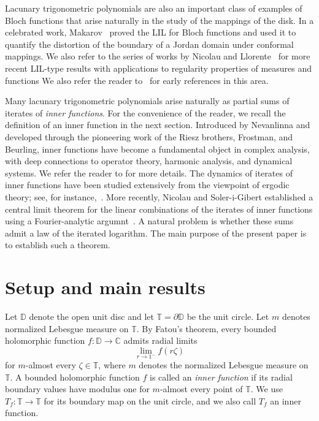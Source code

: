 \documentclass[12pt, reqno, final, a4paper]{amsart}
\theoremstyle{plain}
\theoremstyle{definition}
\theoremstyle{remark}
\newcommand{\D}{\mathbb D}
\newcommand{\T}{\mathbb T}
\newcommand{\1}{\mathbf 1}
\begin{document}
Lacunary trigonometric polynomials are also an important class of examples of Bloch functions that arise naturally in the study of the mappings of the disk. In a celebrated work, Makarov~\cite{Makarov} proved the LIL for Bloch functions and used it to quantify the distortion of the boundary of a Jordan domain under conformal mappings. We also refer to the series of works by Nicolau and Llorente~\cite{Nicolau2018, llorente2004regularity, llorente2026law} for more recent LIL-type results with applications to regularity properties of measures and functions
We also refer the reader to~\cite[Section 20]{Bingham} for early references in this area. 



Many lacunary trigonometric polynomials arise naturally as partial sums of iterates of \emph{inner functions}. For the convenience of the reader, we recall the definition of an inner function in the next section. Introduced by Nevanlinna and developed through the pioneering work of the Riesz brothers, Frostman, and Beurling, inner functions have become a fundamental object in complex analysis, with deep connections to operator theory, harmonic analysis, and dynamical systems. We refer the reader to \cite{Garnett2007, Mashreghi} for more details.
The dynamics of iterates of inner functions have been studied extensively from the viewpoint of ergodic theory; see, for instance,~\cite{AaronsonNadkarni2023, Aaronson1978, FerreiraNicolau2024, IvriiUrbanski2023, Ivrii2026, NicolauSoler2022, Pommerenke1981}. More recently, Nicolau and Soler-i-Gibert established a central limit theorem for the linear combinations of the iterates of inner functions using a Fourier-analytic argumnt~\cite{NicolauSoler2022, NicolauSoler2026}. A natural problem is whether these sums admit a law of the iterated logarithm. The main purpose of the present paper is to establish such a theorem.

\section{Setup and main results}
\label{sec:Setup}
Let $\D$ denote the open unit disc and let $\T=\partial\D$ be the unit circle. Let $m$ denotes normalized Lebesgue measure on $\T$.  By Fatou's theorem, every bounded holomorphic function $f:\D\to\mathbb{C}$ admits radial limits
\[
\lim_{r\to1^-}f(r\zeta)
\]
for $m$-almost every $\zeta\in\T$, where $m$ denotes the normalized Lebesgue measure on $\T$. A bounded holomorphic function $f$ is called an \emph{inner function} if its radial boundary values have modulus one for $m$-almost every point of $\T$. We use $T_f:\T\to\T$ for its boundary map on the unit circle, and we also call $T_f$ an inner function.
\end{document}
